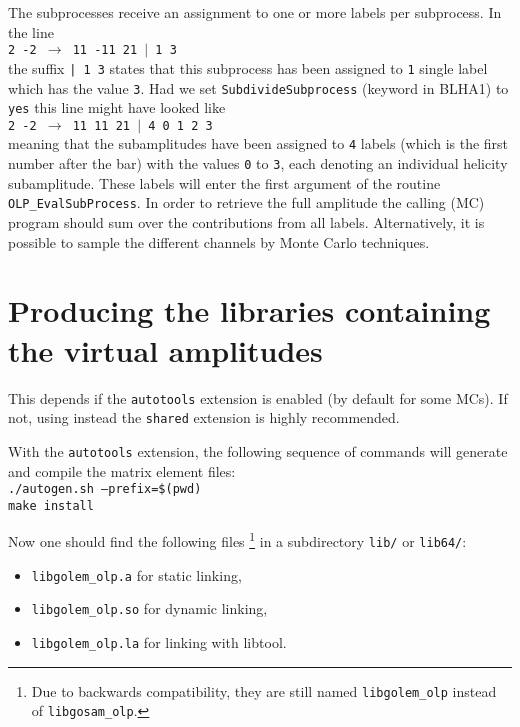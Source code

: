 The subprocesses receive an assignment to one or more
labels per subprocess. In the line\\
{\tt 2 -2 $\to$ 11 -11 21 $|$ 1 3}\\
the suffix \texttt{| 1 3}
states that this subprocess has been assigned to \texttt{1}
single label which has the value \texttt{3}. 
Had we set \texttt{SubdivideSubprocess} (keyword in BLHA1)
to \texttt{yes} this line might have looked like\\
{\tt 2 -2 $\to$ 11 11 21 $|$ 4 0 1 2 3}\\
meaning that the subamplitudes
have been assigned to
\texttt{4} labels (which is the first number after the bar) with
the values \texttt{0} to \texttt{3}, each denoting 
an individual helicity subamplitude. These labels will enter the
first argument of the routine \texttt{OLP\_EvalSubProcess}.
In order to retrieve the full amplitude the calling (MC) program should sum
over the contributions from all labels. Alternatively, it is possible to
sample the different channels by Monte Carlo techniques.

\section{Producing the libraries containing the virtual amplitudes}

This depends if the \texttt{autotools} extension is enabled
(by default for some MCs). If not, using instead the \texttt{shared} extension
is highly recommended.

With the \texttt{autotools} extension, the following sequence of commands will generate
and compile the matrix element files:\\
{\tt ./autogen.sh --prefix=\$(pwd)}\\
{\tt make install}

Now one should find the following files%
\footnote{Due to backwards compatibility, they are still named \texttt{libgolem\_olp} instead of \texttt{libgosam\_olp}.}
in a subdirectory \texttt{lib/} or \texttt{lib64/}:
\begin{itemize}
\item \texttt{libgolem\_olp.a} for static linking,
\item \texttt{libgolem\_olp.so} for dynamic linking,
\item \texttt{libgolem\_olp.la} for linking with libtool.
\end{itemize}

